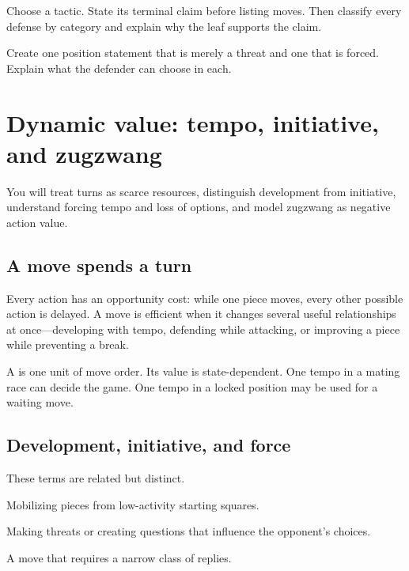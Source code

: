 \begin{exercise}
Choose a tactic. State its terminal claim before listing moves. Then classify every defense by category and explain why the leaf supports the claim.
\end{exercise}

\begin{exercise}
Create one position statement that is merely a threat and one that is forced. Explain what the defender can choose in each.
\end{exercise}


\chapter{Dynamic value: tempo, initiative, and zugzwang}
\begin{learningbox}
You will treat turns as scarce resources, distinguish development from initiative, understand forcing tempo and loss of options, and model zugzwang as negative action value.
\end{learningbox}

\section{A move spends a turn}
Every action has an opportunity cost: while one piece moves, every other possible action is delayed. A move is efficient when it changes several useful relationships at once---developing with tempo, defending while attacking, or improving a piece while preventing a break.

A  is one unit of move order. Its value is state-dependent. One tempo in a mating race can decide the game. One tempo in a locked position may be used for a waiting move.

\section{Development, initiative, and force}
These terms are related but distinct.

\begin{description}[style=nextline,leftmargin=2.4em,labelsep=.5em]
\item[Development.] Mobilizing pieces from low-activity starting squares.
\item[Initiative.] Making threats or creating questions that influence the opponent's choices.
\item[Forcing tempo.] A move that requires a narrow class of replies.
\end{description}

